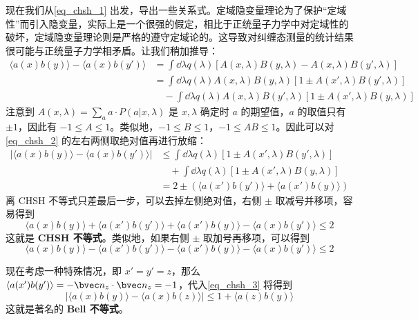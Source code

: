 现在我们从\autoref{eq_chsh_1} 出发，导出一些关系式。定域隐变量理论为了保护“定域性”而引入隐变量，实际上是一个很强的假定，相比于正统量子力学中对定域性的破坏，定域隐变量理论则是严格的遵守定域论的。这导致对纠缠态测量的统计结果很可能与正统量子力学相矛盾。让我们稍加推导：
\begin{equation}\label{eq_chsh_2}
\begin{aligned}
\langle a(x) b(y)\rangle - \langle a(x)b(y')\rangle &= \int \dd\lambda q(\lambda) [A(x,\lambda)B(y,\lambda)-A(x,\lambda)B(y',\lambda)]\\
&=\int \dd\lambda q(\lambda)A(x,\lambda)B(y,\lambda)[1\pm A(x',\lambda)B(y',\lambda)]\\&\quad -\int \dd\lambda q(\lambda)A(x,\lambda)B(y',\lambda)[1\pm A(x',\lambda)B(y,\lambda)]
\end{aligned}
\end{equation}
注意到 $A(x,\lambda)=\sum_a a\cdot P(a|x,\lambda)$ 是 $x,\lambda$ 确定时 $a$ 的期望值，$a$ 的取值只有 $\pm 1$，因此有 $-1\le A\le 1$。类似地，$-1\le B\le 1$，$-1\le AB\le 1$。因此可以对\autoref{eq_chsh_2} 的左右两侧取绝对值再进行放缩：
\begin{equation}\label{eq_chsh_3}
\begin{aligned}
|\langle a(x) b(y)\rangle - \langle a(x)b(y')\rangle|&\le \int \dd\lambda q(\lambda) [1\pm A(x',\lambda)B(y',\lambda)]\\
&\quad+\int \dd\lambda q(\lambda) [1\pm A(x',\lambda)B(y,\lambda)]\\
&=2 \pm (\langle a(x')b(y')\rangle+\langle a(x')b(y)\rangle)
\end{aligned}
\end{equation}
离 CHSH 不等式只差最后一步，可以去掉左侧绝对值，右侧 $\pm$ 取减号并移项，容易得到
\begin{equation}
\langle a(x) b(y)\rangle+
\langle a(x') b(y')\rangle+
\langle a(x') b(y)\rangle-
\langle a(x) b(y')\rangle\le 2
\end{equation}
这就是 \textbf{CHSH 不等式}。类似地，如果右侧 $\pm$ 取加号再移项，可以得到
\begin{equation}
\langle a(x) b(y)\rangle-
\langle a(x') b(y')\rangle-
\langle a(x') b(y)\rangle-
\langle a(x) b(y')\rangle\le 2
\end{equation}

现在考虑一种特殊情况，即 $x'=y'=z$，那么 $\langle a(x')b(y')\rangle = -\bvec n_z\cdot \bvec n_z=-1$，代入\autoref{eq_chsh_3} 将得到
\begin{equation}
|\langle a(x) b(y)\rangle - \langle a(x)b(z)\rangle|\le 1+\langle a(z)b(y)\rangle
\end{equation}
这就是著名的 \textbf{Bell 不等式}。
